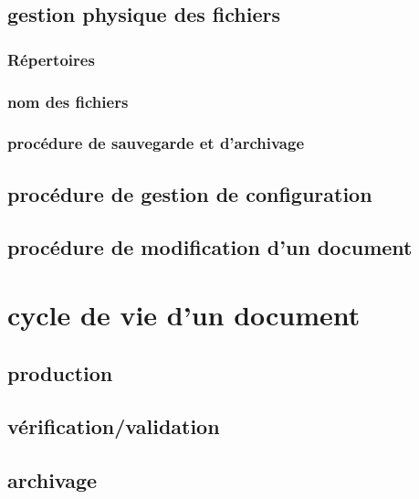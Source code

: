 	\subsection{gestion physique des fichiers}
		\subsubsection{Répertoires}
		\subsubsection{nom des fichiers}
		\subsubsection{procédure de sauvegarde et d'archivage}
	\subsection{procédure de gestion de configuration}
	\subsection{procédure de modification d'un document}

\section{cycle de vie d'un document}
	\subsection{production}
	\subsection{vérification/validation}
	\subsection{archivage}

